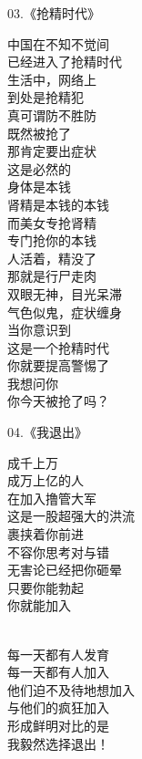 \documentclass{ctexart}
\begin{document}
\begin{multicols}{2}
    \begin{center}
        03.《抢精时代》\it

        中国在不知不觉间 \\ 已经进入了抢精时代 \\ 生活中，网络上 \\ 到处是抢精犯 \\ 真可谓防不胜防 \\ 既然被抢了 \\ 那肯定要出症状 \\ 这是必然的 \\ 身体是本钱 \\ 肾精是本钱的本钱 \\ 而美女专抢肾精 \\ 专门抢你的本钱 \\ 人活着，精没了 \\ 那就是行尸走肉 \\ 双眼无神，目光呆滞 \\ 气色似鬼，症状缠身 \\ 当你意识到 \\ 这是一个抢精时代 \\ 你就要提高警惕了 \\ 我想问你 \\ 你今天被抢了吗？
    \end{center}

    \begin{center}
        04.《我退出》\it

        成千上万 \\ 成万上亿的人 \\ 在加入撸管大军 \\ 这是一股超强大的洪流 \\ 裹挟着你前进 \\ 不容你思考对与错 \\ 无害论已经把你砸晕 \\ 只要你能勃起 \\ 你就能加入

        ~\\

        每一天都有人发育 \\ 每一天都有人加入 \\ 他们迫不及待地想加入 \\ 与他们的疯狂加入 \\ 形成鲜明对比的是 \\ 我毅然选择退出！

        ~\\


\end{center}
\end{multicols}
\end{document}
